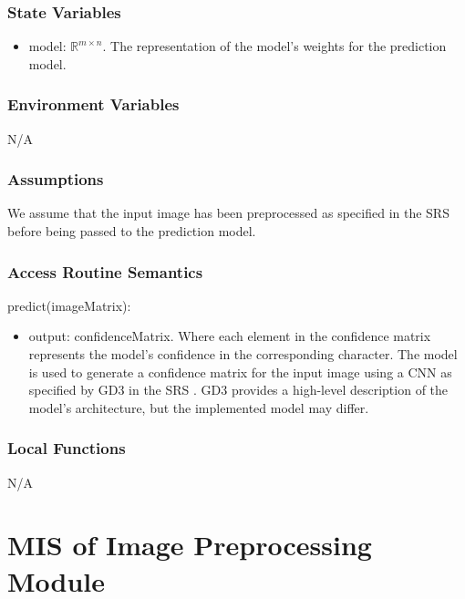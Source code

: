\documentclass[12pt, titlepage]{article}
\begin{document}
\subsubsection{State Variables}

\begin{itemize}
  \item model: $\mathbb{R}^{m \times n}$. The representation of the model's
  weights for the prediction model.
\end{itemize}

\subsubsection{Environment Variables}

N/A

\subsubsection{Assumptions}

We assume that the input image has been preprocessed as specified in the SRS
before being passed to the prediction model.


\subsubsection{Access Routine Semantics}

\noindent predict(imageMatrix):
\begin{itemize}
\item output: confidenceMatrix. Where each element in the confidence matrix
represents the model's confidence in the corresponding character. The model is
used to generate a confidence matrix for the input image using a CNN as
specified by GD3 in the SRS \cite[4.2.3]{SRS}. GD3 provides a high-level
description of the model's architecture, but the implemented model may differ.
\end{itemize}


\subsubsection{Local Functions}

N/A

\newpage
\section{MIS of Image Preprocessing Module} \label{mPreprocessing}
\end{document}
